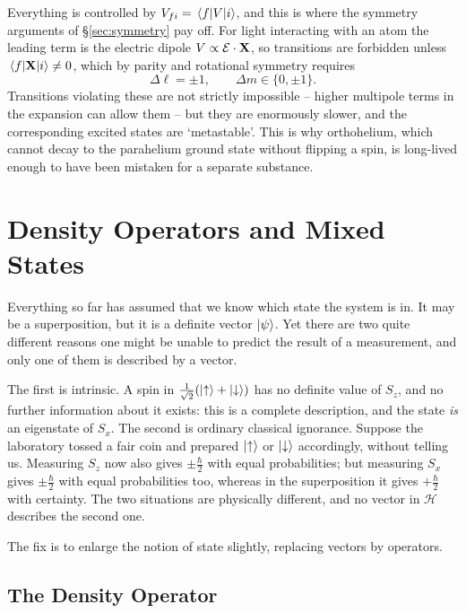 \documentclass[a4paper]{scrartcl}
\begin{document}
\begin{remark}
    Everything is controlled by $V_{fi} = \mel{f}{V}{i}$, and this is where the symmetry arguments of \S\ref{sec:symmetry} pay off. For light interacting with an atom the leading term is the electric dipole $V \propto \mathbf{\mathcal{E}}\cdot\mathbf{X}$, so transitions are forbidden unless $\mel{f}{\mathbf{X}}{i}\neq0$, which by parity and rotational symmetry requires
    $$
    \Delta \ell = \pm 1, \qquad \Delta m \in \{0, \pm 1\}.
    $$
    Transitions violating these are not strictly impossible -- higher multipole terms in the expansion can allow them -- but they are enormously slower, and the corresponding excited states are `metastable'. This is why orthohelium, which cannot decay to the parahelium ground state without flipping a spin, is long-lived enough to have been mistaken for a separate substance.
\end{remark}

\section{Density Operators and Mixed States}\label{sec:density}

Everything so far has assumed that we know which state the system is in. It may be a superposition, but it is a definite vector $\ket\psi$. Yet there are two quite different reasons one might be unable to predict the result of a measurement, and only one of them is described by a vector.

The first is intrinsic. A spin in $\frac{1}{\sqrt2}(\ket\uparrow + \ket\downarrow)$ has no definite value of $S_z$, and no further information about it exists: this is a complete description, and the state \emph{is} an eigenstate of $S_x$. The second is ordinary classical ignorance. Suppose the laboratory tossed a fair coin and prepared $\ket\uparrow$ or $\ket\downarrow$ accordingly, without telling us. Measuring $S_z$ now also gives $\pm\frac\hbar2$ with equal probabilities; but measuring $S_x$ gives $\pm\frac\hbar2$ with equal probabilities too, whereas in the superposition it gives $+\frac\hbar2$ with certainty. The two situations are physically different, and no vector in $\mathcal{H}$ describes the second one.

The fix is to enlarge the notion of state slightly, replacing vectors by operators.

\subsection{The Density Operator}
\end{document}

